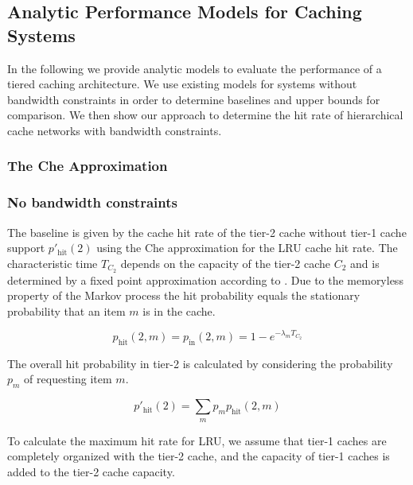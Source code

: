 \subsection{Analytic Performance Models for Caching Systems}

In the following we provide analytic models to evaluate the performance of a tiered caching architecture.
We use existing models for systems without bandwidth constraints in order to determine baselines and upper bounds for comparison.
We then show our approach to determine the hit rate of hierarchical cache networks with bandwidth constraints.

\subsubsection{The Che Approximation}

\subsubsection{No bandwidth constraints}

The baseline is given by the cache hit rate of the tier-2 cache without tier-1 cache support $p'_\text{hit}(2)$ using the Che approximation for the LRU cache hit rate. The characteristic time $T_{C_2}$ depends on the capacity of the tier-2 cache $C_2$ and is determined by a fixed point approximation according to \cite{che2002hierarchical}.
Due to the memoryless property of the Markov process the hit probability equals the stationary probability that an item $m$ is in the cache.

\begin{equation}
p_\text{hit}(2,m)=p_\text{in}(2,m)=1-e^{-\lambda_{m}T_{C_2}}
\end{equation}

The overall hit probability in tier-2 is calculated by considering the probability $p_m$ of requesting item $m$.

\begin{equation}
p'_\text{hit}(2)=\sum_m p_m p_\text{hit}(2,m)
\end{equation}

To calculate the maximum hit rate for LRU, we assume that tier-1 caches are completely organized with the tier-2 cache, and the capacity of tier-1 caches is added to the tier-2 cache capacity.

